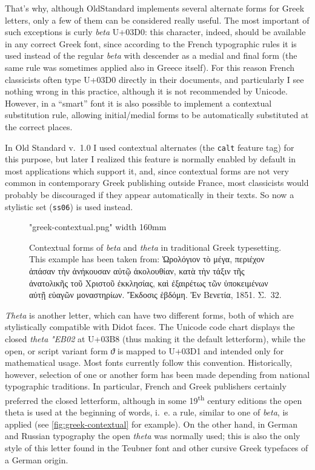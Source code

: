 \documentclass[12pt,a4paper,openany]{book}
\begin{document}
That’s why, although OldStandard implements several alternate forms for
Greek letters, only a few of them can be considered really useful. The most
important of such exceptions is curly \textit{beta} U+03D0: this character,
indeed, should be available in any correct Greek font, since according to
the French typographic rules it is used instead of the regular
\textit{beta} with descender as a medial and final form (the same rule was
sometimes applied also in Greece itself). For this reason French
classicists often type U+03D0 directly in their documents, and particularly
I see nothing wrong in this practice, although it is not recommended by
Unicode. However, in a “smart” font it is also possible to implement
a contextual substitution rule, allowing initial/medial forms to be
automatically substituted at the correct places.

In Old Standard v.~1.0 I used contextual alternates (the \texttt{calt}
feature tag) for this purpose, but later I realized this feature is
normally enabled by default in most applications which support it, and,
since contextual forms are not very common in contemporary Greek publishing
outside France, most classicists would probably be discouraged if they appear
automatically in their texts. So now a stylistic set (\texttt{ss06}) 
is used instead.

\begin{figure}[htb]

\centerline{\XeTeXpicfile "greek-contextual.png" width 160mm}

\caption{Contextual forms of \textit{beta} and \textit{theta} in
traditional Greek typesetting. This example has been taken from: Ὡρολόγιον
τὸ μέγα, περιέχον ἁπάσαν τὴν ἀνήκουσαν αὐτῷ ἀκολουθίαν, κατὰ τὴν τάξιν τῆς
ἀνατολικῆς τοῦ Χριστοῦ ἐκκλησίας, καὶ ἐξαιρέτως τῶν ὑποκειμένων αὐτῇ εὐαγῶν
μοναστηρίων. Ἔκδοσις ἑβδόμη. Ἐν Βενετία, 1851. Σ.~32.}

\label{fig:greek-contextual}

\end{figure}

\textit{Theta} is another letter, which can have two different forms, both
of which are stylistically compatible with Didot faces. The Unicode
code chart displays the closed \textit{theta} \textit{\char"EB02} at U+03B8
(thus making it the default letterform), while the open, or script variant
form \textit{ϑ} is mapped to U+03D1 and intended only for mathematical
usage.  Most fonts currently follow this convention. Historically, however,
selection of one or another form has been made depending from national
typographic traditions. In particular, French and Greek publishers
certainly preferred the closed letterform, although in some
19\textsuperscript{th} century editions the open theta is used at the
beginning of words, i.~e. a rule, similar to one of \textit{beta}, is
applied (see \autoref{fig:greek-contextual} for example). On the other
hand, in German and Russian typography the open \textit{theta} was normally
used; this is also the only style of this letter found in the Teubner font
and other cursive Greek typefaces of a German origin.
\end{document}

